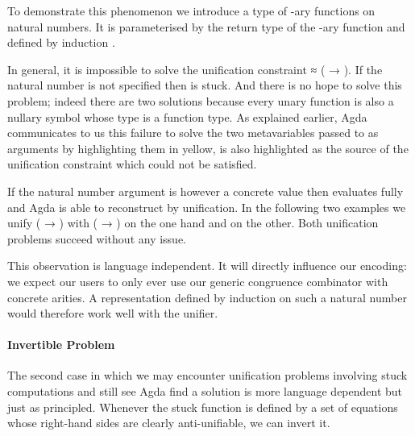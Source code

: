 To demonstrate this phenomenon we introduce a type  of -ary
functions on natural numbers. It is parameterised by the return type of the
-ary function and defined by induction .


In general, it is impossible to solve the unification constraint
{  } ≈ {( → )}. If the natural
number is not specified then  is stuck. And there is no
hope to solve this problem; indeed there are two solutions because
every unary function is also a nullary symbol whose type is a function
type. As explained earlier, Agda communicates to us this failure to solve
the two metavariables passed to  as arguments by highlighting them
in yellow,  is also highlighted as the source of the unification
constraint which could not be satisfied.


If the natural number argument is however a concrete value then 
evaluates fully and Agda is able to reconstruct  by unification. In
the following two examples we unify {( → )} with {( → )}
on the one hand and {} on the other. Both unification problems succeed
without any issue.

\begin{minipage}{0.225\textwidth}
\end{minipage}\begin{minipage}{0.225\textwidth}
\end{minipage}

This observation is language independent. It will directly influence our
encoding: we expect our users to only ever use our generic congruence
combinator with concrete arities. A representation defined by induction
on such a natural number would therefore work well with the unifier.

\paragraph{Invertible Problem} The second case in which we may encounter
unification problems involving stuck computations and still see Agda
find a solution is more language dependent but just as principled.
Whenever the stuck function is defined by a set of equations whose
right-hand sides are clearly anti-unifiable, we can invert it.

